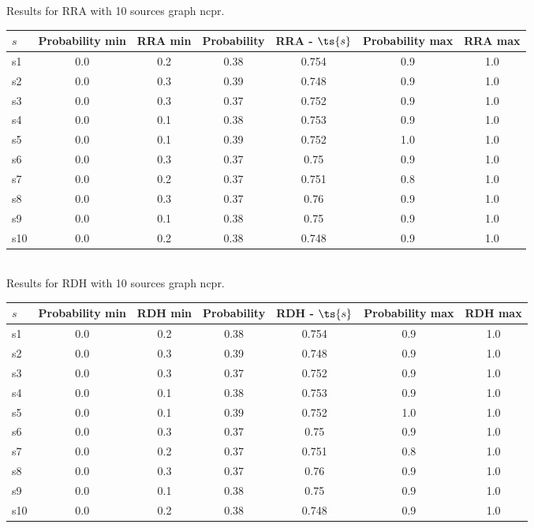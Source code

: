 \documentclass{article}
\begin{document}
\noindent Results for RRA with 10 sources graph ncpr.

\noindent\begin{tabular}{|l|c|c|c|c|c|c|}
\hline
$s$& Probability min & RRA min & Probability & RRA - $\ts{s}$ & Probability max & RRA max\\
\hline
s1 &0.0 & 0.2 & 0.38 & 0.754 & 0.9 & 1.0\\
\hline
s2 &0.0 & 0.3 & 0.39 & 0.748 & 0.9 & 1.0\\
\hline
s3 &0.0 & 0.3 & 0.37 & 0.752 & 0.9 & 1.0\\
\hline
s4 &0.0 & 0.1 & 0.38 & 0.753 & 0.9 & 1.0\\
\hline
s5 &0.0 & 0.1 & 0.39 & 0.752 & 1.0 & 1.0\\
\hline
s6 &0.0 & 0.3 & 0.37 & 0.75 & 0.9 & 1.0\\
\hline
s7 &0.0 & 0.2 & 0.37 & 0.751 & 0.8 & 1.0\\
\hline
s8 &0.0 & 0.3 & 0.37 & 0.76 & 0.9 & 1.0\\
\hline
s9 &0.0 & 0.1 & 0.38 & 0.75 & 0.9 & 1.0\\
\hline
s10 &0.0 & 0.2 & 0.38 & 0.748 & 0.9 & 1.0\\
\hline
\end{tabular}\\

\noindent Results for RDH with 10 sources graph ncpr.

\noindent\begin{tabular}{|l|c|c|c|c|c|c|}
\hline
$s$& Probability min & RDH min & Probability & RDH - $\ts{s}$ & Probability max & RDH max\\
\hline
s1 &0.0 & 0.2 & 0.38 & 0.754 & 0.9 & 1.0\\
\hline
s2 &0.0 & 0.3 & 0.39 & 0.748 & 0.9 & 1.0\\
\hline
s3 &0.0 & 0.3 & 0.37 & 0.752 & 0.9 & 1.0\\
\hline
s4 &0.0 & 0.1 & 0.38 & 0.753 & 0.9 & 1.0\\
\hline
s5 &0.0 & 0.1 & 0.39 & 0.752 & 1.0 & 1.0\\
\hline
s6 &0.0 & 0.3 & 0.37 & 0.75 & 0.9 & 1.0\\
\hline
s7 &0.0 & 0.2 & 0.37 & 0.751 & 0.8 & 1.0\\
\hline
s8 &0.0 & 0.3 & 0.37 & 0.76 & 0.9 & 1.0\\
\hline
s9 &0.0 & 0.1 & 0.38 & 0.75 & 0.9 & 1.0\\
\hline
s10 &0.0 & 0.2 & 0.38 & 0.748 & 0.9 & 1.0\\
\hline
\end{tabular}\\
\end{document}
